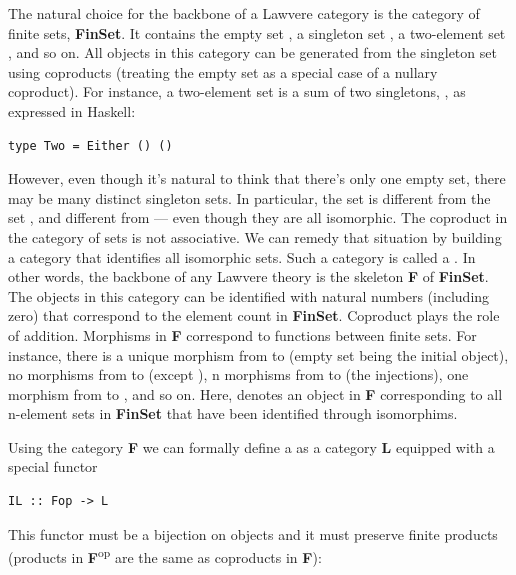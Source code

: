 The natural choice for the backbone of a Lawvere category is the
category of finite sets, \textbf{FinSet}. It contains the empty set
, a singleton set , a two-element set ,
and so on. All objects in this category can be generated from the
singleton set using coproducts (treating the empty set as a special case
of a nullary coproduct). For instance, a two-element set is a sum of two
singletons, , as expressed in Haskell:

\begin{Verbatim}[commandchars=\\\{\}]
type Two = Either () ()
\end{Verbatim}

However, even though it's natural to think that there's only one empty
set, there may be many distinct singleton sets. In particular, the set
 is different from the set , and
different from  --- even though they are all isomorphic. The
coproduct in the category of sets is not associative. We can remedy that
situation by building a category that identifies all isomorphic sets.
Such a category is called a . In other words, the
backbone of any Lawvere theory is the skeleton \textbf{F} of
\textbf{FinSet}. The objects in this category can be identified with
natural numbers (including zero) that correspond to the element count in
\textbf{FinSet}. Coproduct plays the role of addition. Morphisms in
\textbf{F} correspond to functions between finite sets. For instance,
there is a unique morphism from  to  (empty set
being the initial object), no morphisms from  to 
(except ), n morphisms from  to
 (the injections), one morphism from  to ,
and so on. Here,  denotes an object in \textbf{F}
corresponding to all n-element sets in \textbf{FinSet} that have been
identified through isomorphims.

Using the category \textbf{F} we can formally define a  as a category \textbf{L} equipped with a special functor

\begin{Verbatim}[commandchars=\\\{\}]
IL :: Fop -> L
\end{Verbatim}

This functor must be a bijection on objects and it must preserve finite
products (products in \textbf{F}\textsuperscript{op} are the same as
coproducts in \textbf{F}):


